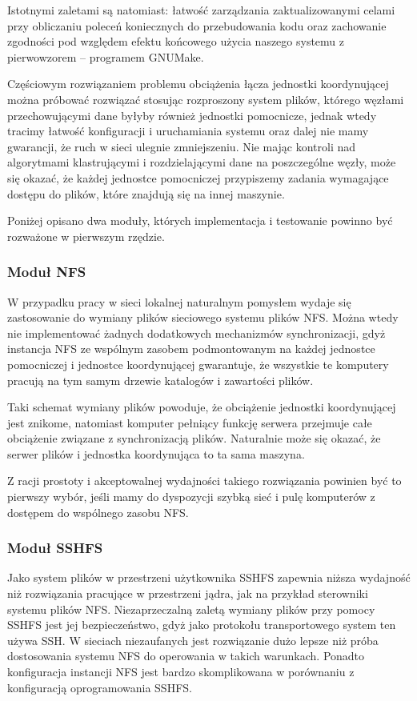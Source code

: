 \documentclass[a4paper]{article}
\begin{document}
Istotnymi zaletami są natomiast: łatwość zarządzania zaktualizowanymi celami przy obliczaniu poleceń koniecznych do przebudowania kodu oraz zachowanie zgodności pod względem efektu końcowego użycia naszego systemu z pierwowzorem -- programem GNUMake.

Częściowym rozwiązaniem problemu obciążenia łącza jednostki koordynującej można próbować rozwiązać stosując rozproszony system plików, którego węzłami przechowującymi dane byłyby również jednostki pomocnicze, jednak wtedy tracimy łatwość konfiguracji i uruchamiania systemu oraz dalej nie mamy gwarancji, że ruch w sieci ulegnie zmniejszeniu.
Nie mając kontroli nad algorytmami klastrującymi i rozdzielającymi dane na poszczególne węzły, może się okazać, że każdej jednostce pomocniczej przypiszemy zadania wymagające dostępu do plików, które znajdują się na innej maszynie.

Poniżej opisano dwa moduły, których implementacja i testowanie powinno być rozważone w pierwszym rzędzie.

\subsubsection{Moduł NFS}

W przypadku pracy w sieci lokalnej naturalnym pomysłem wydaje się zastosowanie do wymiany plików sieciowego systemu plików NFS.
Można wtedy nie implementować żadnych dodatkowych mechanizmów synchronizacji, gdyż instancja NFS ze wspólnym zasobem podmontowanym na każdej jednostce pomocniczej i jednostce koordynującej gwarantuje, że wszystkie te komputery pracują na tym samym drzewie katalogów i zawartości plików.

Taki schemat wymiany plików powoduje, że obciążenie jednostki koordynującej jest znikome, natomiast komputer pełniący funkcję serwera przejmuje całe obciążenie związane z synchronizacją plików.
Naturalnie może się okazać, że serwer plików i jednostka koordynująca to ta sama maszyna.

Z racji prostoty i akceptowalnej wydajności takiego rozwiązania powinien być to pierwszy wybór, jeśli mamy do dyspozycji szybką sieć i pulę komputerów z dostępem do wspólnego zasobu NFS.

\subsubsection{Moduł SSHFS}

Jako system plików w przestrzeni użytkownika SSHFS zapewnia niższa wydajność niż rozwiązania pracujące w przestrzeni jądra, jak na przykład sterowniki systemu plików NFS.
Niezaprzeczalną zaletą wymiany plików przy pomocy SSHFS jest jej bezpieczeństwo, gdyż jako protokołu transportowego system ten używa SSH.
W sieciach niezaufanych jest rozwiązanie dużo lepsze niż próba dostosowania systemu NFS do operowania w takich warunkach.
Ponadto konfiguracja instancji NFS jest bardzo skomplikowana w porównaniu z konfiguracją oprogramowania SSHFS.
\end{document}
